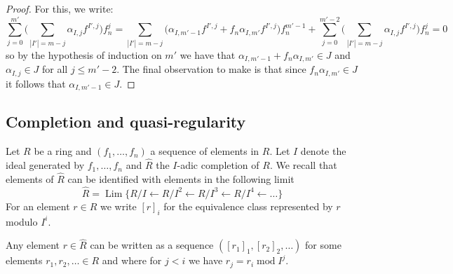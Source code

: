 \documentclass[12pt]{article}
\theoremstyle{plain}
\theoremstyle{definition}
\begin{document}
\begin{proof}
	For this, we write:
	\[\sum_{j = 0}^{m'}\Big(\sum_{|I'| = m-j}\alpha_{I,j}f^{I',j}\Big)f_n^j = \sum_{|I'| = m - j}\big(\alpha_{I,m'-1}f^{I',j} + f_n\alpha_{I,m'}f^{I',j}\big)f_n^{m'-1} + \sum_{j = 0}^{m' - 2}\Big(\sum_{|I'| = m-j}\alpha_{I,j}f^{I',j}\Big)f_n^{j} = 0\]
	so by the hypothesis of induction on $m'$ we have that $\alpha_{I,m'-1} + f_n\alpha_{I,m'} \in J$ and $\alpha_{I,j} \in J$ for all $j \leq m' - 2$. The final observation to make is that since $f_n\alpha_{I,m'} \in J$ it follows that $\alpha_{I,m'-1} \in J$.
\end{proof}
%
\subsection{Completion and quasi-regularity}

Let $R$ be a ring and $(f_1, \ldots, f_n)$ a sequence of elements in $R$. Let $I$ denote the ideal generated by $f_1, \ldots, f_n$ and $\hat{R}$ the $I$-adic completion of $R$. We recall that elements of $\hat{R}$ can be identified with elements in the following limit
\begin{equation}
	\hat{R} = \operatorname{Lim}\Big\{ R/I \leftarrow R/I^2 \leftarrow R/I^3 \leftarrow R/I^4 \leftarrow \ldots\Big\}
	\end{equation}
For an element $r \in R$ we write $[r]_i$ for the equivalence class represented by $r$ modulo $I^i$.

Any element $r \in \hat{R}$ can be written as a sequence $([r_1]_{1}, [r_2]_{2}, \ldots)$ for some elements $r_1, r_2, \ldots \in R$ and where for $j < i$ we have $r_j = r_i\operatorname{ mod }I^{j}$.
\end{document}
